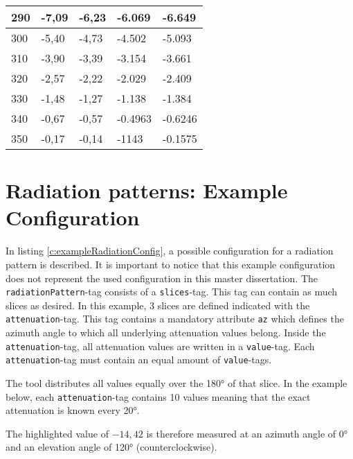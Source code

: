 \begin{table*}[!ht]
\begin{tabular}{|l|l|l|l|l|}
290 & -7,09 & -6,23 & -6.069 & -6.649 \\ \hline
300 & -5,40 & -4,73 & -4.502 & -5.093 \\ \hline
310 & -3,90 & -3,39 & -3.154 & -3.661 \\ \hline
320 & -2,57 & -2,22 & -2.029 & -2.409 \\ \hline
330 & -1,48 & -1,27 & -1.138 & -1.384 \\ \hline
340 & -0,67 & -0,57 & -0.4963 & -0.6246 \\ \hline
350 & -0,17 & -0,14 & -1143 & -0.1575 \\ \hline
\end{tabular}
\label{tab:datasheetRadiation}
\end{table*}



\chapter{Radiation patterns: Example Configuration}
\label{ch:radpatexampleconfig}

In listing \ref{c:exampleRadiationConfig}, a possible configuration for a radiation pattern is described.
It is important to notice that this example configuration does not represent the used configuration in this master dissertation.
The \verb|radiationPattern|-tag consists of a \verb|slices|-tag. This tag can contain as much slices as desired.
In this example, 3 slices are defined indicated with the \verb|attenuation|-tag. This tag contains a mandatory attribute \verb|az| 
which defines the azimuth angle to which all underlying attenuation values belong.
Inside the \verb|attenuation|-tag, all attenuation values are written in a \verb|value|-tag. Each \verb|attenuation|-tag must contain 
an equal amount of \verb|value|-tags.

The tool distributes all values equally over the \ang{180} of that slice. In the example below, each \verb|attenuation|-tag contains 10 values
meaning that the exact attenuation is known every \ang{20}.

The highlighted value of $-14,42$ is therefore measured at an azimuth angle of \ang{0} and an elevation angle of \ang{120} (counterclockwise).

